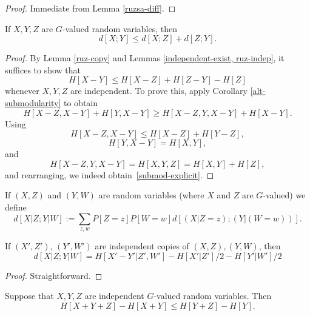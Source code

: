 \begin{proof}  Immediate from Lemma \ref{ruzsa-diff}.
\end{proof}

\begin{lemma}\label{ruzsa-triangle} If $X,Y,Z$ are $G$-valued random variables, then
$$ d[X;Y] \leq d[X;Z] + d[Z;Y].$$
\end{lemma}

\begin{proof} By Lemma \ref{ruz-copy} and Lemmas \ref{independent-exist, ruz-indep}, it suffices to show that
\begin{equation}\label{submod-explicit} H[X - Y] \leq H[X-Z] + H[Z-Y] - H[Z]\end{equation}
whenever $X, Y, Z$ are independent. To prove this, apply Corollary \ref{alt-submodularity} to obtain
\[ H[X - Z, X - Y] + H[Y, X - Y] \geq H[X - Z, Y, X - Y] + H[X - Y].\]
Using
\[ H[X - Z, X - Y] \leq H[X - Z] + H[Y - Z],\]
\[ H[Y, X - Y] = H[X, Y], \] and
\[ H[X - Z, Y, X - Y] = H[X, Y, Z] = H[X, Y] + H[Z],\] and rearranging, we indeed obtain~\eqref{submod-explicit}.
\end{proof}

\begin{definition}\label{cond-dist-def}
If $(X, Z)$ and $(Y, W)$ are random variables (where $X$ and $Z$ are $G$-valued) we define
$$ d[X  | Z; Y | W] := \sum_{z,w} P[Z=z] P[W=w] d[(X|Z=z); (Y|(W=w))].$$
\end{definition}

\begin{lemma}\label{cond-dist-alt}  If $(X',Z')$, $(Y',W')$ are independent copies of $(X,Z), (Y,W)$, then
$$  d[X  | Z;Y | W] = H[X'-Y'|Z',W'] - H[X'|Z']/2 - H[Y'|W']/2$$
\end{lemma}

\begin{proof} Straightforward.
\end{proof}

\begin{lemma}\label{kv}
Suppose that $X, Y, Z$ are independent $G$-valued random variables. Then
\[
  H[X + Y + Z] - H[X + Y] \leq H[Y+Z] - H[Y].
\]
\end{lemma}

